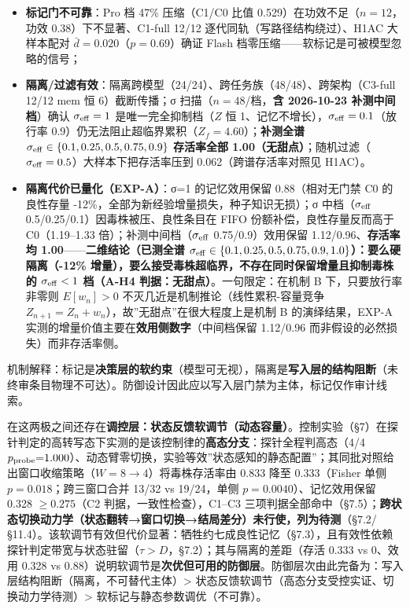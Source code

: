 \documentclass[
]{ctexart}
\providecommand{\tightlist}{%
  \setlength{\itemsep}{0pt}\setlength{\parskip}{0pt}}
\begin{document}
\begin{itemize}
\tightlist
\item
  \textbf{标记门不可靠}：Pro 档 47\% 压缩（C1/C0 比值
  0.529）在功效不足（\(n=12\)，功效 0.38）下不显著、C1-full 12/12
  逐代同轨（写路径结构绕过）、H1AC 大样本配对
  \(\bar d=0.020\)（\(p=0.69\)）确证 Flash
  档零压缩------软标记是可被模型忽略的信号；
\item
  \textbf{隔离/过滤有效}：隔离跨模型（24/24）、跨任务族（48/48）、跨架构（C3-full
  12/12 mem 恒 6）截断传播；σ 扫描（\(n=48\)/档，\textbf{含 2026-10-23
  补测中间档}）确认 \(\sigma_{\rm eff}=1\) 是唯一完全抑制档（\(Z\) 恒
  1、记忆不增长），\(\sigma_{\rm eff}=0.1\)（放行率
  0.9）仍无法阻止超临界累积（\(Z_f=4.60\)）；\textbf{补测全谱
  \(\sigma_{\rm eff}\in\{0.1,0.25,0.5,0.75,0.9\}\) 存活率全部
  1.00（无甜点）}；随机过滤（\(\sigma_{\rm eff}=0.5\)）大样本下把存活率压到
  0.062（跨谱存活率对照见 H1AC）。
\item
  \textbf{隔离代价已量化（EXP-A）}：σ=1 的记忆效用保留 0.88（相对无门禁
  C0 的良性存量 -12\%，全部为新经验增量损失，种子知识无损）；σ
  中档（\(\sigma_{\rm eff}\) 0.5/0.25/0.1）因毒株被压、良性条目在 FIFO
  份额补偿，良性存量反而高于 C0（1.19--1.33
  倍）；补测中间档（\(\sigma_{\rm eff}\) 0.75/0.9）效用保留
  1.12/0.96、\textbf{存活率均 1.00}------\textbf{二维结论（已测全谱
  \(\sigma_{\rm eff}\in\{0.1,0.25,0.5,0.75,0.9,1.0\}\)）：要么硬隔离（-12\%
  增量），要么接受毒株超临界，不存在同时保留增量且抑制毒株的
  \(\sigma_{\rm eff}<1\) 档（A-H4 判据：无甜点）}。一句限定：在机制 B
  下，只要放行率非零则 \(E[w_n]>0\)
  不灭几近是机制推论（线性累积-容量竞争
  \(Z_{n+1}=Z_n+w_n\)），故''无甜点''在很大程度上是机制 B
  的演绎结果，EXP-A 实测的增量价值主要在\textbf{效用侧数字}（中间档保留
  1.12/0.96 而非假设的必然损失）而非存活率侧。
\end{itemize}

机制解释：标记是\textbf{决策层的软约束}（模型可无视），隔离是\textbf{写入层的结构阻断}（未终审条目物理不可达）。防御设计因此应以写入层门禁为主体，标记仅作审计线索。

在这两极之间还存在\textbf{调控层：状态反馈软调节（动态容量）}。控制实验（§7）在探针判定的高转写态下实测的是该控制律的\textbf{高态分支}：探针全程判高态（4/4
\(p_{\rm probe}{=}1.000\)）、动态臂零切换，实验等效''状态感知的静态配置''；其同批对照给出窗口收缩策略（\(W{=}8\to4\)）将毒株存活率由
0.833 降至 0.333（Fisher 单侧 \(p{=}0.018\)；跨三窗口合并 13/32 vs
19/24，单侧 \(p{=}0.0040\)）、记忆效用保留 0.328 \(\ge0.275\)（C2
判据，一致性检查），C1--C3
三项判据全部命中（§7.5）；\textbf{跨状态切换动力学（状态翻转→窗口切换→结局差分）未行使，列为待测}（§7.2/§11.4）。该软调节有效但代价显著：牺牲约七成良性记忆（§7.3），且有效性依赖探针判定带宽与状态驻留（\(\tau>D\)，§7.2）；其与隔离的差距（存活
0.333 vs 0、效用 0.328 vs
0.88）说明软调节是\textbf{次优但可用的防御层}。防御层次由此完备为：写入层结构阻断（隔离，不可替代主体）\textgreater{}
状态反馈软调节（高态分支受控实证、切换动力学待测）\textgreater{}
软标记与静态参数调优（不可靠）。
\end{document}
